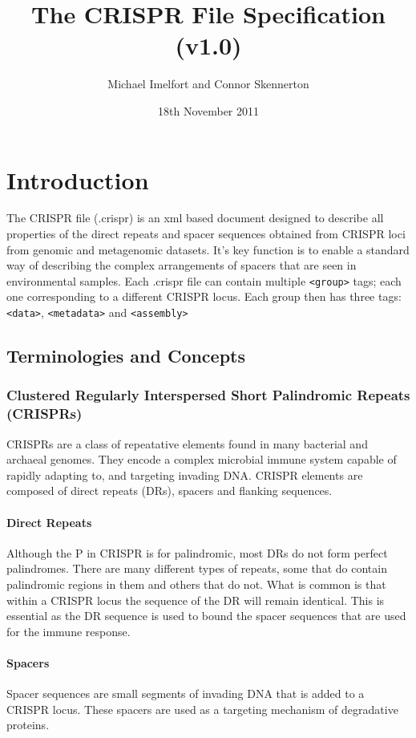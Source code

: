 \documentclass[11pt]{article} %
\title{The CRISPR File Specification (v1.0)}
\author{Michael Imelfort and Connor Skennerton}
\date{18th November 2011} %
\begin{document}
\maketitle

\section{Introduction}

The CRISPR file (.crispr) is an xml based document designed to describe all properties of the direct repeats and spacer sequences obtained from CRISPR loci from genomic and metagenomic datasets.  It's key function is to enable a standard way of describing the complex arrangements of spacers that are seen in environmental samples.  Each .crispr file can contain multiple  \lstinline[language=XML_new]$<group>$   tags; each one corresponding to a different CRISPR locus.  Each group then has three tags: \lstinline[language=XML_new]$<data>$, \lstinline[language=XML_new]$<metadata>$ and \lstinline[language=XML_new]$<assembly>$ 
\subsection{Terminologies and Concepts}
\subsubsection{Clustered Regularly Interspersed Short Palindromic Repeats (CRISPRs)}
CRISPRs are a class of repeatative elements found in many bacterial and archaeal genomes.  They encode a complex microbial immune system capable of rapidly adapting to, and targeting invading DNA.  CRISPR elements are composed of direct repeats (DRs), spacers and flanking sequences.
\paragraph{Direct Repeats}
Although the P in CRISPR is for palindromic, most DRs do not form perfect palindromes.  There are many different types of repeats, some that do contain palindromic regions in them and others that do not.  What is common is that within a CRISPR locus the sequence of the DR will remain identical. This is essential as the DR sequence is used to bound the spacer sequences that are used for the immune response.
\paragraph{Spacers}
Spacer sequences are small segments of invading DNA that is added to a CRISPR locus.  These spacers are used as a targeting mechanism of degradative proteins. 
\end{document}
